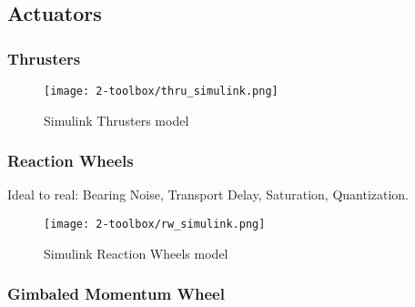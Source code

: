 \subsection{Actuators}
\subsubsection{Thrusters}
\begin{figure}[hb]
    \centering
    \texttt{[image: 2-toolbox/thru\_simulink.png]}
    \caption{Simulink Thrusters model}
    \label{fig:thru_simulink}
\end{figure}
\subsubsection{Reaction Wheels}
Ideal to real: Bearing Noise, Transport Delay, Saturation, Quantization.
\begin{figure}[hb]
    \centering
    \texttt{[image: 2-toolbox/rw\_simulink.png]}
    \caption{Simulink Reaction Wheels model}
    \label{fig:rw_simulink}
\end{figure}
\subsubsection{Gimbaled Momentum Wheel}